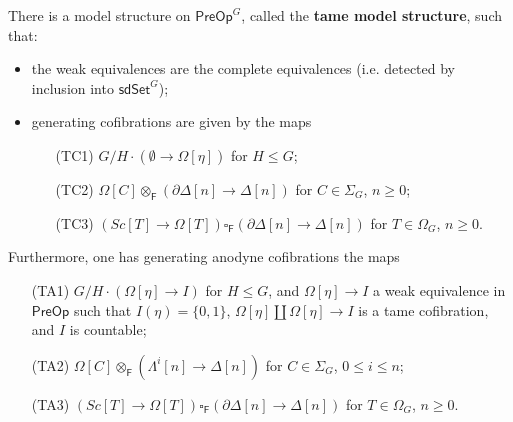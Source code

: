 \documentclass[a4paper,10pt
,draft
]{article}%
\renewcommand{\1}{\eta}%
\begin{document}
\begin{theorem}
      \label{TAMEMS_THM}
	There is a model structure on 
	$\mathsf{PreOp}^G$,
	called the \textbf{tame model structure},
	such that:
\begin{itemize}
	\item the weak equivalences are the complete equivalences (i.e. detected by inclusion into 
	$\mathsf{sdSet}^G$);
	\item generating cofibrations are given by the maps
	\begin{itemize}
		\item[(TC1)] $G/H \cdot \left(\emptyset \to\Omega[\eta]\right)$ for $H\leq G$;
		\item[(TC2)] $\Omega[C] \otimes_{\mathsf{F}} \left(\partial \Delta[n] \to \Delta[n]\right)$ for $C \in \Sigma_G$, $n \geq 0$;
		\item[(TC3)] 
$\left( Sc[T] \to \Omega[T] \right) 
\square_{\mathsf{F}} 
\left(\partial \Delta[n] \to \Delta[n]\right)$ for $T \in \Omega_G$, $n \geq 0$.
	\end{itemize}
\end{itemize}
Furthermore, one has generating anodyne cofibrations the maps
\begin{itemize}
	\item[(TA1)] $G/H \cdot 
	\left(\Omega[\eta] \to I \right)$ for $H \leq G$,
	and $\Omega[\eta] \to I$ a weak equivalence in $\mathsf{PreOp}$ such that $I(\eta) = \{0,1\}$, $\Omega[\eta] \amalg \Omega[\eta] \to I$ is a tame cofibration, and $I$ is countable;
	\item[(TA2)] $\Omega[C] \otimes_{\mathsf{F}}\left(\Lambda^i[n] \to \Delta[n]\right)$ for $C \in \Sigma_G$, $0 \leq i \leq n$;
	\item[(TA3)] 
$\left( Sc[T] \to \Omega[T] \right) 
\square_{\mathsf{F}} 
\left(\partial \Delta[n] \to \Delta[n]\right)$ for $T \in \Omega_G$, $n \geq 0$.
	\end{itemize}
\end{theorem}
\end{document}

